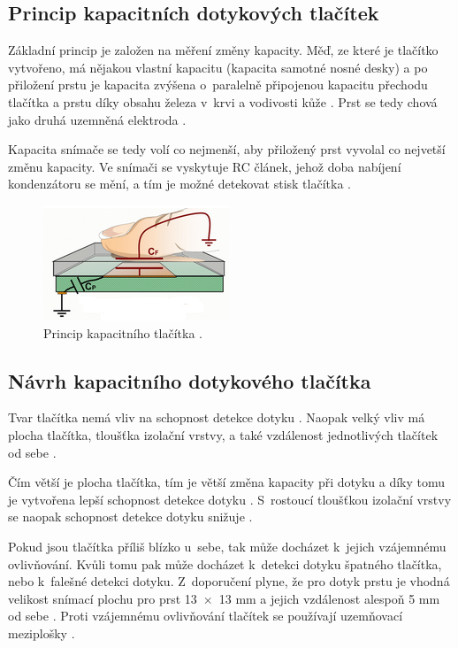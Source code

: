 \subsection{Princip kapacitních dotykových tlačítek}
Základní princip je založen na měření změny kapacity. Měď, ze které je tlačítko vytvořeno, má
nějakou vlastní kapacitu (kapacita samotné nosné desky) a po přiložení prstu je kapacita zvýšena o~paralelně 
připojenou kapacitu přechodu tlačítka a prstu díky obsahu železa v~krvi a vodivosti kůže \cite{PrincipKapTl}. 
Prst se tedy chová jako druhá uzemněná elektroda \cite{PrincipKapTl}. 

Kapacita snímače se tedy volí co nejmenší, aby přiložený prst vyvolal co nejvetší změnu kapacity. Ve snímači se vyskytuje
RC článek, jehož doba nabíjení kondenzátoru se mění, a tím je možné detekovat stisk tlačítka \cite{PrincipKapTl}. 

\begin{figure}[!h]
  \begin{center}
    \includegraphics[scale=1]{obrazky/kapacitni_princip.png}
  \end{center}
  \caption[Princip kapacitního tlačítka]{Princip kapacitního tlačítka \cite{PrincipKapTl}.}
\end{figure}

\subsection{Návrh kapacitního dotykového tlačítka}
Tvar tlačítka nemá vliv na schopnost detekce dotyku \cite{PrincipKapTl}. Naopak velký vliv má plocha tlačítka, tloušťka
izolační vrstvy, a také vzdálenost jednotlivých tlačítek od sebe \cite{PrincipKapTl}. 

Čím větší je plocha tlačítka, tím je větší změna kapacity při dotyku a díky tomu je vytvořena lepší schopnost detekce 
dotyku \cite{PrincipKapTl}. S~rostoucí tloušťkou izolační vrstvy se naopak schopnost detekce dotyku snižuje \cite{PrincipKapTl}.

Pokud jsou tlačítka příliš blízko u~sebe, tak může docházet k~jejich vzájemnému ovlivňování. Kvůli tomu pak může docházet
k~detekci dotyku špatného tlačítka, nebo k~falešné detekci dotyku. Z~doporučení plyne, že pro dotyk prstu je vhodná velikost snímací 
plochu pro prst 13~$\times$~13 mm a jejich vzdálenost alespoň 5 mm od sebe \cite{PrincipKapTl}. Proti vzájemnému ovlivňování tlačítek
se používají uzemňovací meziplošky \cite{PrincipKapTl}. 

